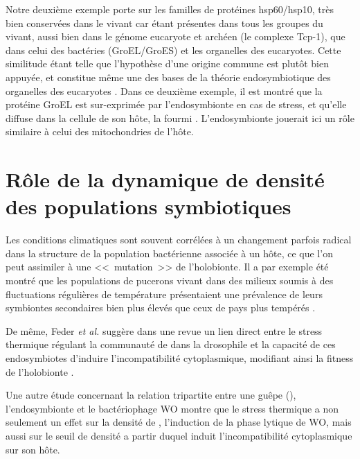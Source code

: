 Notre deuxième exemple porte sur les familles de protéines hsp60/hsp10, très bien conservées dans le vivant car étant présentes dans tous les groupes du vivant, aussi bien dans le génome eucaryote et archéen (le complexe Tcp-1), que dans celui des bactéries (GroEL/GroES) et les organelles des eucaryotes.
Cette similitude étant telle que l'hypothèse d'une origine commune est plutôt bien appuyée, et constitue même une des bases de la théorie endosymbiotique des organelles des eucaryotes \cite{gupta1995}.
Dans ce deuxième exemple, il est montré que la protéine GroEL est sur-exprimée par l'endosymbionte  en cas de stress, et qu'elle diffuse dans la cellule de son hôte, la fourmi  \cite{stoll2009}.
L'endosymbionte jouerait ici un rôle similaire à celui des mitochondries de l'hôte.

\section{Rôle de la dynamique de densité des populations symbiotiques}

Les conditions climatiques sont souvent corrélées à un changement parfois radical dans la structure de la population bactérienne associée à un hôte, ce que l'on peut assimiler à une <<~mutation~>> de l'holobionte.
Il a par exemple été montré que les populations de pucerons vivant dans des milieux soumis à des fluctuations régulières de température présentaient une prévalence de leurs symbiontes secondaires bien plus élevés que ceux de pays plus tempérés \cite{harmon2009}.

De même, Feder \textit{et al.} suggère dans une revue un lien direct entre le stress thermique régulant la communauté de  dans la drosophile et la capacité de ces endosymbiotes d'induire l'incompatibilité cytoplasmique, modifiant ainsi la fitness de l'holobionte \cite{feder1999}. 

Une autre étude \cite{bordenstein2011} concernant la relation tripartite entre une guêpe (), l'endosymbionte  et le bactériophage WO montre que le stress thermique a non seulement un effet sur la densité de , l'induction de la phase lytique de WO, mais aussi sur le seuil de densité a partir duquel  induit l'incompatibilité cytoplasmique sur son hôte.
